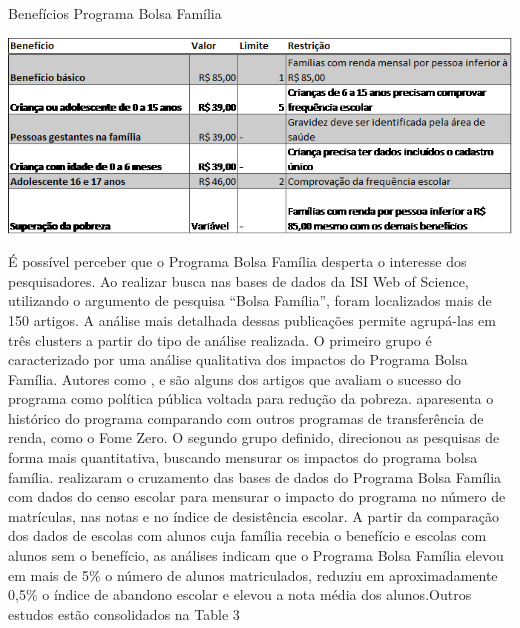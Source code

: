 \documentclass[12pt]{article}
\begin{document}
\begin{table}[ht]
\centering
\caption{Benefícios Programa Bolsa Família }
\label{tab:exTable2}
\includegraphics[width=1\textwidth]{beneficios_bolsa_familia.png}
\end{table} 

	É possível perceber que o Programa Bolsa Família desperta o interesse dos pesquisadores. Ao realizar busca nas bases de dados da ISI Web of Science, utilizando o argumento de pesquisa “Bolsa Família”, foram localizados mais de 150 artigos. A análise mais detalhada dessas publicações permite agrupá-las em três clusters a partir do tipo de análise realizada. O primeiro grupo é caracterizado por uma análise qualitativa dos impactos do Programa Bolsa Família. Autores como \cite{hall:2006}, \cite{fenwick:2009avoiding} e \cite{rocha2009developments} são alguns dos artigos que avaliam o sucesso do programa como política pública voltada para redução da pobreza. \cite{hall:2006} aparesenta o histórico do programa comparando com outros programas de transferência de renda, como o Fome Zero.  O segundo grupo definido, direcionou as pesquisas de forma mais quantitativa, buscando mensurar os impactos do programa bolsa família. \cite{glewwe2012impact} realizaram o cruzamento das bases de dados do Programa Bolsa Família com dados do censo escolar para mensurar o impacto do programa no número de matrículas, nas notas e no índice de desistência escolar. A partir da comparação dos dados de escolas com alunos cuja família recebia o benefício e escolas com alunos sem o benefício, as análises indicam que o Programa Bolsa Família elevou em mais de 5\% o número de alunos matriculados, reduziu em aproximadamente 0,5\% o índice de abandono escolar e elevou a nota média dos alunos.Outros estudos estão consolidados na Table 3
\end{document}
